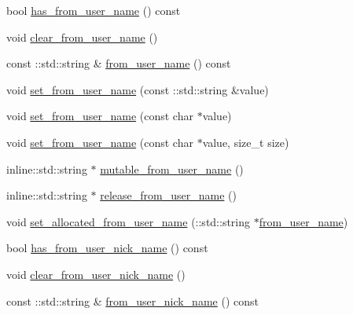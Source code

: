 \begin{DoxyCompactItemize}
\item 
bool \hyperlink{class_i_m_1_1_base_define_1_1_server_msg_info_aaf42b1df568fd6a0f2fe04bd434e4dcf}{has\+\_\+from\+\_\+user\+\_\+name} () const 
\item 
void \hyperlink{class_i_m_1_1_base_define_1_1_server_msg_info_ae2a615f169cc7decccd8bf2a6aabfa07}{clear\+\_\+from\+\_\+user\+\_\+name} ()
\item 
const \+::std\+::string \& \hyperlink{class_i_m_1_1_base_define_1_1_server_msg_info_ae56081fe08ec8a635ce45d71efdc3d27}{from\+\_\+user\+\_\+name} () const 
\item 
void \hyperlink{class_i_m_1_1_base_define_1_1_server_msg_info_a219b63c03be993b1ca8bb34be35464ed}{set\+\_\+from\+\_\+user\+\_\+name} (const \+::std\+::string \&value)
\item 
void \hyperlink{class_i_m_1_1_base_define_1_1_server_msg_info_a7ff5ff528b8687b955db73288c0f01e0}{set\+\_\+from\+\_\+user\+\_\+name} (const char $\ast$value)
\item 
void \hyperlink{class_i_m_1_1_base_define_1_1_server_msg_info_a7d86bf3f55a8c9cef7f1a172e014ed6d}{set\+\_\+from\+\_\+user\+\_\+name} (const char $\ast$value, size\+\_\+t size)
\item 
inline\+::std\+::string $\ast$ \hyperlink{class_i_m_1_1_base_define_1_1_server_msg_info_a371e0bbc02bd1eed37de2ecb6443dc1c}{mutable\+\_\+from\+\_\+user\+\_\+name} ()
\item 
inline\+::std\+::string $\ast$ \hyperlink{class_i_m_1_1_base_define_1_1_server_msg_info_abd0eeebc43ee7db18150288e72d03711}{release\+\_\+from\+\_\+user\+\_\+name} ()
\item 
void \hyperlink{class_i_m_1_1_base_define_1_1_server_msg_info_a295b7633264196cf2442c5249ed37a20}{set\+\_\+allocated\+\_\+from\+\_\+user\+\_\+name} (\+::std\+::string $\ast$\hyperlink{class_i_m_1_1_base_define_1_1_server_msg_info_ae56081fe08ec8a635ce45d71efdc3d27}{from\+\_\+user\+\_\+name})
\item 
bool \hyperlink{class_i_m_1_1_base_define_1_1_server_msg_info_ae5200dd8c37e6aae82ff1b5326a117e3}{has\+\_\+from\+\_\+user\+\_\+nick\+\_\+name} () const 
\item 
void \hyperlink{class_i_m_1_1_base_define_1_1_server_msg_info_a38bae8025bc9a3538c88b413bf460aaa}{clear\+\_\+from\+\_\+user\+\_\+nick\+\_\+name} ()
\item 
const \+::std\+::string \& \hyperlink{class_i_m_1_1_base_define_1_1_server_msg_info_a065590708d0f177fdee8bc1076c75465}{from\+\_\+user\+\_\+nick\+\_\+name} () const 
\item 

\end{DoxyCompactItemize}
